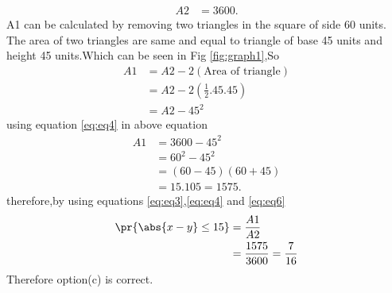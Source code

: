 \documentclass[journal,12pt,twocolumn]{IEEEtran}
\begin{document}
\begin{enumerate}
\begin{align}
    A2&=3600.
    \label{eq:eq4}
\end{align}
A1 can be calculated by removing two triangles in the square of side 60 units. The area of two triangles are same and equal to 
triangle of base 45 units and height 45 units.Which can be seen in Fig \ref{fig:graph1},So
\begin{align}
    A1&=A2-2(\text{Area of triangle})
    \\
    &=A2-2(\frac{1}{2}.45.45)
    \\
    &=A2 -45^{2}
    \label{eq:eq5}
\end{align}
using equation \eqref{eq:eq4} in above equation
\begin{align}
    A1&=3600-45^{2}
    \\
    &=60^{2}-45^{2}
    \\
    &=(60-45)(60+45)
    \\
    &=15.105=1575 .
    \label{eq:eq6}
\end{align}
therefore,by using equations \eqref{eq:eq3},\eqref{eq:eq4} and \eqref{eq:eq6}
\begin{align}
    \pr{\abs{x - y}\leq15}&=\frac{A1}{A2}
    \\
    &=\frac{1575}{3600}=\frac{7}{16}
\end{align}
 Therefore option(c) is correct.
\end{enumerate}
\end{document}
